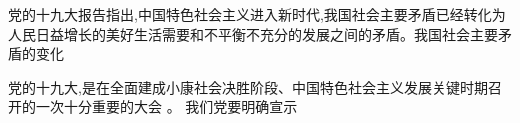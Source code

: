 \question 党的十九大报告指出,中国特色社会主义进入新时代,我国社会主要矛盾已经转化为人民日益增长的美好生活需要和不平衡不充分的发展之间的矛盾。我国社会主要矛盾的变化
\par{}
\begin{solution}
\end{solution}
\question 党的十九大,是在全面建成小康社会决胜阶段、中国特色社会主义发展关键时期召开的一次十分重要的大会
。 我们党要明确宣示
\par\fourch{\textcolor{red}{举什么旗、走什么路}}{\textcolor{red}{以什么样的精神状态}}{\textcolor{red}{担负什么样的历史使命}}{\textcolor{red}{实现什么样的奋斗目标}}
\begin{solution}
\end{solution}
